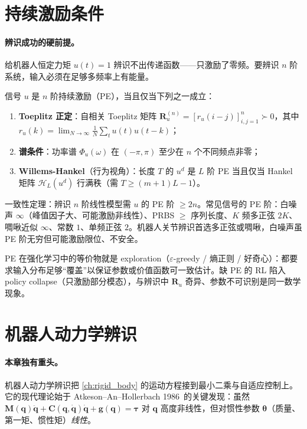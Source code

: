 \section{持续激励条件}
\label{sec:pe}

\paragraph{辨识成功的硬前提。}
给机器人恒定力矩 $u(t)=1$ 辨识不出传递函数——只激励了零频。要辨识 $n$ 阶系统，输入必须在足够多频率上有能量。

\begin{definition}[持续激励的三种等价刻画]
\label{def:pe}
信号 $u$ 是 $n$ 阶持续激励（PE），当且仅当下列之一成立：
\begin{enumerate}
  \item \textbf{Toeplitz 正定}：自相关 Toeplitz 矩阵 $\mathbf R_u^{(n)}=[r_u(i-j)]_{i,j=1}^n\succ0$，其中 $r_u(k)=\lim_{N\to\infty}\tfrac1N\sum_t u(t)u(t-k)$；
  \item \textbf{谱条件}：功率谱 $\Phi_u(\omega)$ 在 $(-\pi,\pi)$ 至少在 $n$ 个不同频点非零；
  \item \textbf{Willems-Hankel}（行为视角）：长度 $T$ 的 $u^d$ 是 $L$ 阶 PE 当且仅当 Hankel 矩阵 $\mathcal H_L(u^d)$ 行满秩（需 $T\ge(m+1)L-1$）。
\end{enumerate}
\end{definition}

一致性定理：辨识 $n$ 阶线性模型需 $u$ 的 PE 阶 $\ge 2n$。常见信号的 PE 阶：白噪声 $\infty$（峰值因子大、可能激励非线性）、PRBS $\ge$ 序列长度、$K$ 频多正弦 $2K$、啁啾近似 $\infty$、常数 $1$、单频正弦 $2$。机器人关节辨识首选多正弦或啁啾，白噪声虽 PE 阶无穷但可能激励限位、不安全。

\begin{insight}
PE 在强化学习中的等价物就是 exploration（$\varepsilon$-greedy / 熵正则 / 好奇心）：都要求输入分布足够“覆盖”以保证参数或价值函数可一致估计。缺 PE 的 RL 陷入 policy collapse（只激励部分模态），与辨识中 $\mathbf R_u$ 奇异、参数不可识别是同一数学现象。
\end{insight}

\section{机器人动力学辨识}
\label{sec:robot-id}

\paragraph{本章独有重头。}
机器人动力学辨识把 \cref{ch:rigid_body} 的运动方程接到最小二乘与自适应控制上。它的现代理论始于 Atkeson--An--Hollerbach 1986\,\cite{atkeson1986inertial} 的关键发现：虽然 $\mathbf M(\mathbf q)\ddot{\mathbf q}+\mathbf C(\mathbf q,\dot{\mathbf q})\dot{\mathbf q}+\mathbf g(\mathbf q)=\boldsymbol\tau$ 对 $\mathbf q$ 高度非线性，但对惯性参数 $\boldsymbol\theta$（质量、第一矩、惯性矩）\emph{线性}。

